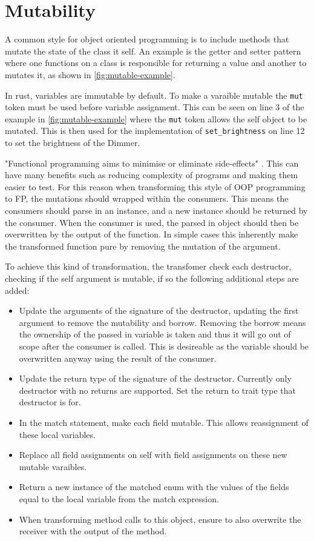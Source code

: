 \documentclass[ oneside,%
                    author={James Elgar},
                    degree={MEng},
                     title={Bidirectional transformer between functional and \\ object-oriented programming in Rust},
                  subtitle={}]{dissertation}
\newcommand{\rust}[1]{\texttt{#1}}
\begin{document}
\section{Mutability}

A common style for object oriented programming is to include methods that mutate the state of the class it self. An example is the getter and setter pattern where one functions on a class is responsible for returning a value and another to mutates it, as shown in \autoref{fig:mutable-example}.

In rust, variables are immutable by default. To make a varaible mutable the \rust{mut} token must be used before variable assignment. This can be seen on line 3 of the example in \autoref{fig:mutable-example} where the \verb|mut| token allows the self object to be mutated. This is then used for the implementation of \rust{set_brightness} on line 12 to set the brightness of the Dimmer. 

"Functional programming aims to minimise or eliminate side-effects" \cite{fp-uok}. This can have many benefits such as reducing complexity of programs and making them easier to test. For this reason when transforming this style of OOP programming to FP, the mutations should wrapped within the consumers. This means the consumers should parse in an instance, and a new instance should be returned by the consumer. When the consumer is used, the parsed in object should then be overwritten by the output of the function.  In simple cases this inherently make the transformed function pure by removing the mutation of the argument.

To achieve this kind of transformation, the transfomer check each destructor, checking if the self argument is mutable, if so the following additional steps are added:

\begin{itemize}
    \item Update the arguments of the signature of the destructor, updating the first argument to remove the mutability and borrow. Removing the borrow means the ownership of the passed in variable is taken and thus it will go out of scope after the consumer is called. This is desireable as the variable should be overwritten anyway using the result of the consumer. 
    \item Update the return type of the signature of the destructor. Currently only destructor with no returns are supported. Set the return to trait type that destructor is for.
    \item In the match statement, make each field mutable. This allows reassignment of these local variables.
    \item Replace all field assignments on self with field assignments on these new mutable varaibles. 
    \item Return a new instance of the matched enum with the values of the fields equal to the local variable from the match expression. 
    \item When transforming method calls to this object, ensure to also overwrite the receiver with the output of the method.
\end{itemize}
\end{document}
